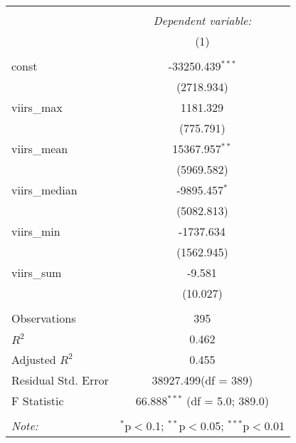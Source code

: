 \begin{table}[!htbp] \centering
\begin{tabular}{@{\extracolsep{5pt}}lc}
\\[-1.8ex]\hline
\hline \\[-1.8ex]
& \multicolumn{1}{c}{\textit{Dependent variable:}} \
\cr \cline{1-2}
\\[-1.8ex] & (1) \\
\hline \\[-1.8ex]
 const & -33250.439$^{***}$ \\
  & (2718.934) \\
 viirs_max & 1181.329$^{}$ \\
  & (775.791) \\
 viirs_mean & 15367.957$^{**}$ \\
  & (5969.582) \\
 viirs_median & -9895.457$^{*}$ \\
  & (5082.813) \\
 viirs_min & -1737.634$^{}$ \\
  & (1562.945) \\
 viirs_sum & -9.581$^{}$ \\
  & (10.027) \\
\hline \\[-1.8ex]
 Observations & 395 \\
 $R^2$ & 0.462 \\
 Adjusted $R^2$ & 0.455 \\
 Residual Std. Error & 38927.499(df = 389)  \\
 F Statistic & 66.888$^{***}$ (df = 5.0; 389.0) \\
\hline
\hline \\[-1.8ex]
\textit{Note:} & \multicolumn{1}{r}{$^{*}$p$<$0.1; $^{**}$p$<$0.05; $^{***}$p$<$0.01} \\
\end{tabular}
\end{table}